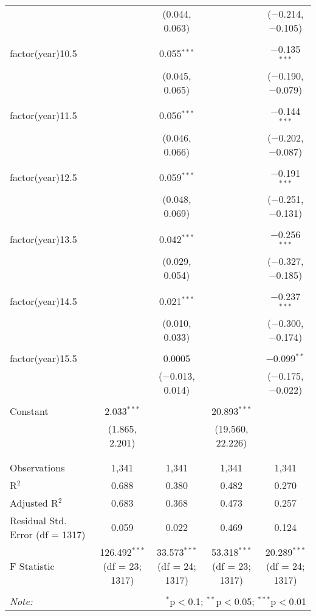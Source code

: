\begin{table}[!htbp]
\begin{tabular}{@{\extracolsep{5pt}}lcccc}
  &  & (0.044, 0.063) &  & ($-$0.214, $-$0.105) \\ 
  & & & & \\ 
 factor(year)10.5 &  & 0.055$^{***}$ &  & $-$0.135$^{***}$ \\ 
  &  & (0.045, 0.065) &  & ($-$0.190, $-$0.079) \\ 
  & & & & \\ 
 factor(year)11.5 &  & 0.056$^{***}$ &  & $-$0.144$^{***}$ \\ 
  &  & (0.046, 0.066) &  & ($-$0.202, $-$0.087) \\ 
  & & & & \\ 
 factor(year)12.5 &  & 0.059$^{***}$ &  & $-$0.191$^{***}$ \\ 
  &  & (0.048, 0.069) &  & ($-$0.251, $-$0.131) \\ 
  & & & & \\ 
 factor(year)13.5 &  & 0.042$^{***}$ &  & $-$0.256$^{***}$ \\ 
  &  & (0.029, 0.054) &  & ($-$0.327, $-$0.185) \\ 
  & & & & \\ 
 factor(year)14.5 &  & 0.021$^{***}$ &  & $-$0.237$^{***}$ \\ 
  &  & (0.010, 0.033) &  & ($-$0.300, $-$0.174) \\ 
  & & & & \\ 
 factor(year)15.5 &  & 0.0005 &  & $-$0.099$^{**}$ \\ 
  &  & ($-$0.013, 0.014) &  & ($-$0.175, $-$0.022) \\ 
  & & & & \\ 
 Constant & 2.033$^{***}$ &  & 20.893$^{***}$ &  \\ 
  & (1.865, 2.201) &  & (19.560, 22.226) &  \\ 
  & & & & \\ 
\hline \\[-1.8ex] 
Observations & 1,341 & 1,341 & 1,341 & 1,341 \\ 
R$^{2}$ & 0.688 & 0.380 & 0.482 & 0.270 \\ 
Adjusted R$^{2}$ & 0.683 & 0.368 & 0.473 & 0.257 \\ 
Residual Std. Error (df = 1317) & 0.059 & 0.022 & 0.469 & 0.124 \\ 
F Statistic & 126.492$^{***}$ (df = 23; 1317) & 33.573$^{***}$ (df = 24; 1317) & 53.318$^{***}$ (df = 23; 1317) & 20.289$^{***}$ (df = 24; 1317) \\ 
\hline 
\hline \\[-1.8ex] 
\textit{Note:}  & \multicolumn{4}{r}{$^{*}$p$<$0.1; $^{**}$p$<$0.05; $^{***}$p$<$0.01} \\ 
\end{tabular} 
\end{table} 
